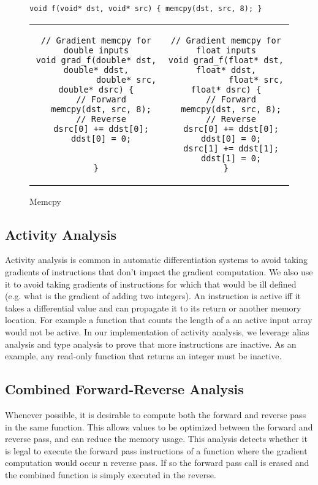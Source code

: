 \begin{figure*}
    \centering
\begin{verbatim}
void f(void* dst, void* src) { memcpy(dst, src, 8); }
\end{verbatim}
\begin{tabular}{c|c}
\begin{minipage}[T]{0.49\linewidth}
\begin{verbatim}
// Gradient memcpy for double inputs
void grad_f(double* dst, double* ddst,
            double* src, double* dsrc) {
  // Forward
  memcpy(dst, src, 8);
  // Reverse
  dsrc[0] += ddst[0];
  ddst[0] = 0;
  
  
}
\end{verbatim}
\end{minipage}&
\begin{minipage}[T]{0.49\linewidth}
\begin{verbatim}
// Gradient memcpy for float inputs
void grad_f(float* dst, float* ddst,
            float* src, float* dsrc) {
  // Forward
  memcpy(dst, src, 8);
  // Reverse
  dsrc[0] += ddst[0];
  ddst[0] = 0;
  dsrc[1] += ddst[1];
  ddst[1] = 0;
}
\end{verbatim}
\end{minipage}
\end{tabular}
\caption{Memcpy}
\label{fig:memcpy}
\end{figure*}

\subsection{Activity Analysis}
Activity analysis is common in automatic differentiation systems to avoid taking gradients of instructions that don't impact the gradient computation. We also use it to avoid taking gradients of instructions for which that would be ill defined (e.g. what is the gradient of adding two integers). An instruction is active iff it takes a differential value and can propagate it to its return or another memory location. For example a function that counts the length of a an active input array would not be active. In our implementation of activity analysis, we leverage alias analysis and type analysis to prove that more instructions are inactive. As an example, any read-only function that returns an integer must be inactive.

\subsection{Combined Forward-Reverse Analysis}
Whenever possible, it is desirable to compute both the forward and reverse pass in the same function. This allows values to be optimized between the forward and reverse pass, and can reduce the memory usage.%
This analysis detects whether it is legal to execute the forward pass instructions of a function where the gradient computation would occur n reverse pass. If so the forward pass call is erased and the combined function is simply executed in the reverse.

